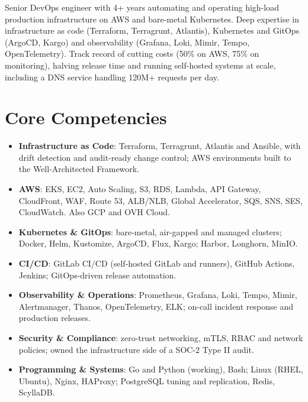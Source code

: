 \documentclass[11pt,a4paper,sans]{moderncv}
\begin{document}
\makecvtitle


\vspace{6pt}
\small{Senior DevOps engineer with 4+ years automating and operating high-load production infrastructure on AWS and bare-metal Kubernetes. Deep expertise in infrastructure as code (Terraform, Terragrunt, Atlantis), Kubernetes and GitOps (ArgoCD, Kargo) and observability (Grafana, Loki, Mimir, Tempo, OpenTelemetry). Track record of cutting costs (50\% on AWS, 75\% on monitoring), halving release time and running self-hosted systems at scale, including a DNS service handling 120M+ requests per day.}


\section{Core Competencies}
\vspace{1pt}
\begin{itemize}

\item \textbf{Infrastructure as Code}: Terraform, Terragrunt, Atlantis and Ansible, with drift detection and audit-ready change control; AWS environments built to the Well-Architected Framework.

\item \textbf{AWS}: EKS, EC2, Auto Scaling, S3, RDS, Lambda, API Gateway, CloudFront, WAF, Route 53, ALB/NLB, Global Accelerator, SQS, SNS, SES, CloudWatch. Also GCP and OVH Cloud.

\item \textbf{Kubernetes \& GitOps}: bare-metal, air-gapped and managed clusters; Docker, Helm, Kustomize, ArgoCD, Flux, Kargo; Harbor, Longhorn, MinIO.

\item \textbf{CI/CD}: GitLab CI/CD (self-hosted GitLab and runners), GitHub Actions, Jenkins; GitOps-driven release automation.

\item \textbf{Observability \& Operations}: Prometheus, Grafana, Loki, Tempo, Mimir, Alertmanager, Thanos, OpenTelemetry, ELK; on-call incident response and production releases.

\item \textbf{Security \& Compliance}: zero-trust networking, mTLS, RBAC and network policies; owned the infrastructure side of a SOC-2 Type II audit.

\item \textbf{Programming \& Systems}: Go and Python (working), Bash; Linux (RHEL, Ubuntu), Nginx, HAProxy; PostgreSQL tuning and replication, Redis, ScyllaDB.

\end{itemize}
\end{document}
